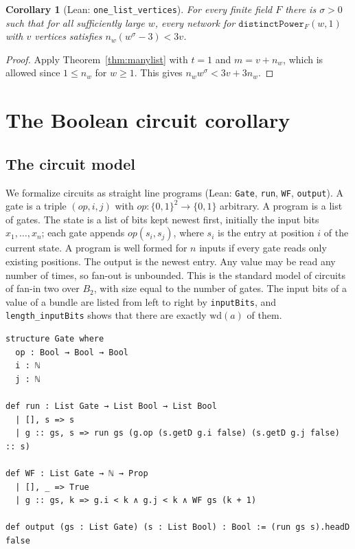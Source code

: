 \documentclass[11pt]{amsart}
\newtheorem{corollary}[theorem]{Corollary}
\theoremstyle{definition}
\theoremstyle{remark}
\newcommand{\lean}[1]{\texttt{#1}}
\newcommand{\wdt}{\mathrm{wd}}
\begin{document}
\begin{corollary}[Lean: \lean{one\_list\_vertices}]\label{cor:onelist}
For every finite field $F$ there is $\sigma>0$ such that for all sufficiently large $w$, every network for $\mathtt{distinctPower}_F(w,1)$ with $v$ vertices satisfies $n_w(w^{\sigma}-3)<3v$.
\end{corollary}
\begin{proof}
Apply Theorem~\ref{thm:manylist} with $t=1$ and $m=v+n_w$, which is allowed since $1\le n_w$ for $w\ge 1$. This gives $n_w w^{\sigma}<3v+3n_w$.
\end{proof}

\section{The Boolean circuit corollary}\label{sec:circuit}

\subsection{The circuit model}
We formalize circuits as straight line programs (Lean: \lean{Gate}, \lean{run}, \lean{WF}, \lean{output}). A gate is a triple $(\mathit{op},i,j)$ with $\mathit{op}\colon\{0,1\}^2\to\{0,1\}$ arbitrary. A program is a list of gates. The state is a list of bits kept newest first, initially the input bits $x_1,\dots,x_n$; each gate appends $\mathit{op}(s_i,s_j)$, where $s_i$ is the entry at position $i$ of the current state. A program is well formed for $n$ inputs if every gate reads only existing positions. The output is the newest entry. Any value may be read any number of times, so fan-out is unbounded. This is the standard model of circuits of fan-in two over $B_2$, with size equal to the number of gates. The input bits of a value of a bundle are listed from left to right by \lean{inputBits}, and \lean{length\_inputBits} shows that there are exactly $\wdt(a)$ of them.

\begin{lstlisting}
structure Gate where
  op : Bool → Bool → Bool
  i : ℕ
  j : ℕ

def run : List Gate → List Bool → List Bool
  | [], s => s
  | g :: gs, s => run gs (g.op (s.getD g.i false) (s.getD g.j false) :: s)

def WF : List Gate → ℕ → Prop
  | [], _ => True
  | g :: gs, k => g.i < k ∧ g.j < k ∧ WF gs (k + 1)

def output (gs : List Gate) (s : List Bool) : Bool := (run gs s).headD false
\end{lstlisting}
\end{document}
